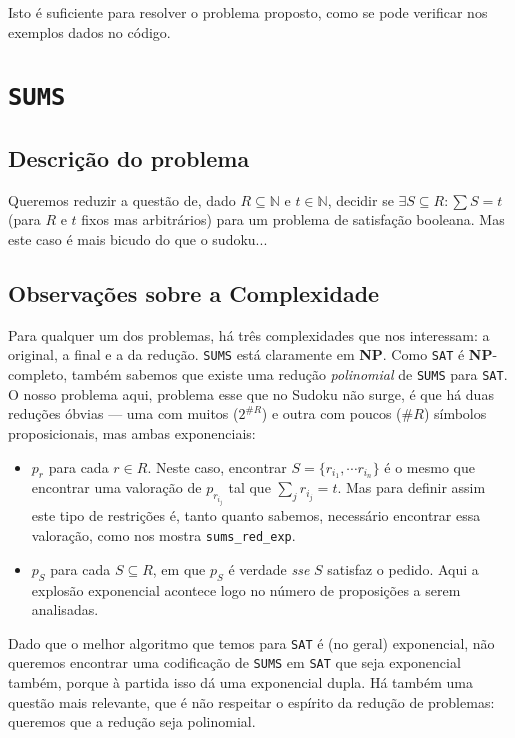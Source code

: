 \documentclass[a4paper,12pt]{article}
\theoremstyle{definition}
\theoremstyle{theorem}
\theoremstyle{remark}
\newcommand{\sums}{\texttt{SUMS}\xspace}
\newcommand{\sat}{\texttt{SAT}\xspace}
\newcommand{\np}{\textbf{NP}\xspace}
\newcommand{\code}[1]{\texttt{#1}}
\begin{document}
Isto é suficiente para resolver o problema proposto, como se pode verificar nos
exemplos dados no código.

\section{\sums}
\subsection{Descrição do problema}
Queremos reduzir a questão de, dado $R\subseteq\mathbb N$ e $t\in\mathbb N$,
decidir se $\exists S\subseteq R : \sum S = t$
(para $R$ e $t$ fixos mas arbitrários) para um problema de satisfação booleana.
Mas este caso
é mais bicudo do
que o sudoku...

\subsection{Observações sobre a Complexidade}
Para qualquer um dos problemas, há três complexidades que nos interessam: a
original, a final e a da redução. 
\sums está claramente em \np. Como \sat é \np-completo, também sabemos que
existe uma redução \emph{polinomial} de \sums para \sat.
O nosso problema aqui, problema esse que
no Sudoku não surge, é que há duas reduções
óbvias \---- uma com muitos ($2^{\#R}$) e outra com poucos ($\#R$) símbolos
proposicionais, mas ambas
exponenciais:
\begin{itemize}
   \item $p_r$ para cada $r\in R$. Neste caso, encontrar
      $S=\{r_{i_1},\cdots r_{i_n}\}$ é o mesmo que encontrar uma valoração
      de $p_{r_{i_j}}$ tal que $\sum_j r_{i_j}=t$.
      Mas para definir assim este tipo de restrições é, tanto quanto sabemos,
      necessário
      encontrar essa valoração, como nos mostra \code{sums\_red\_exp}.

   \item $p_S$ para cada $S\subseteq R$, em que $p_S$ 
      é verdade \emph{sse} $S$ satisfaz o pedido.
      Aqui a explosão exponencial acontece logo no número de proposições a
      serem analisadas.
\end{itemize}

Dado que o melhor algoritmo que temos para \sat é (no geral) exponencial, não
queremos
encontrar uma codificação de \sums em \sat que seja exponencial também, porque
à partida isso dá uma exponencial dupla. Há também uma
questão mais relevante, que é não respeitar o espírito da redução de problemas:
queremos que a redução seja polinomial.
\end{document}
